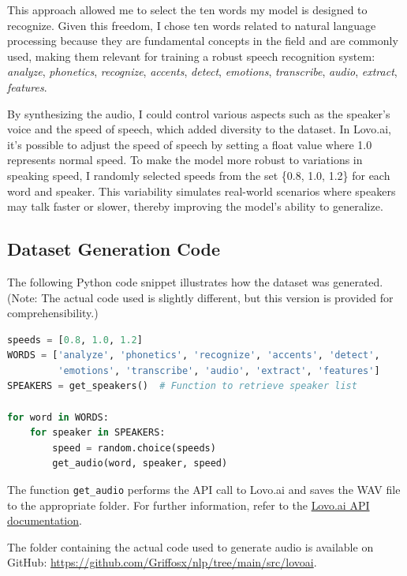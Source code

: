 \documentclass[12pt]{article}
\begin{document}
This approach allowed me to select the ten words my model is designed to recognize. Given this freedom, I chose ten words related to natural language processing because they are fundamental concepts in the field and are commonly used, making them relevant for training a robust speech recognition system: \textit{analyze}, \textit{phonetics}, \textit{recognize}, \textit{accents}, \textit{detect}, \textit{emotions}, \textit{transcribe}, \textit{audio}, \textit{extract}, \textit{features}.

By synthesizing the audio, I could control various aspects such as the speaker's voice and the speed of speech, which added diversity to the dataset. In Lovo.ai, it's possible to adjust the speed of speech by setting a float value where 1.0 represents normal speed. To make the model more robust to variations in speaking speed, I randomly selected speeds from the set \{0.8, 1.0, 1.2\} for each word and speaker. This variability simulates real-world scenarios where speakers may talk faster or slower, thereby improving the model's ability to generalize.

\subsection{Dataset Generation Code}

The following Python code snippet illustrates how the dataset was generated. (Note: The actual code used is slightly different, but this version is provided for comprehensibility.)

\begin{lstlisting}[language=Python, caption=Dataset Generation Script]
speeds = [0.8, 1.0, 1.2]
WORDS = ['analyze', 'phonetics', 'recognize', 'accents', 'detect',
         'emotions', 'transcribe', 'audio', 'extract', 'features']
SPEAKERS = get_speakers()  # Function to retrieve speaker list

for word in WORDS:
    for speaker in SPEAKERS:
        speed = random.choice(speeds)
        get_audio(word, speaker, speed)
\end{lstlisting}

The function \texttt{get\_audio} performs the API call to Lovo.ai and saves the WAV file to the appropriate folder. For further information, refer to the \href{https://docs.genny.lovo.ai/reference/intro/getting-started}{Lovo.ai API documentation}.

The folder containing the actual code used to generate audio is available on GitHub: \href{https://github.com/Griffosx/nlp/tree/main/src/lovoai}{https://github.com/Griffosx/nlp/tree/main/src/lovoai}.
\end{document}
